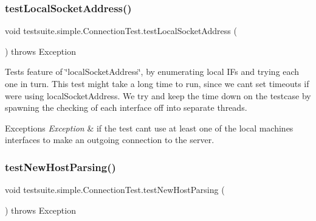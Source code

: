 \subsubsection{\texorpdfstring{test\+Local\+Socket\+Address()}{testLocalSocketAddress()}}
{\footnotesize\ttfamily void testsuite.\+simple.\+Connection\+Test.\+test\+Local\+Socket\+Address (\begin{DoxyParamCaption}{ }\end{DoxyParamCaption}) throws Exception}

Tests feature of \char`\"{}local\+Socket\+Address\char`\"{}, by enumerating local IF\textquotesingle{}s and trying each one in turn. This test might take a long time to run, since we can\textquotesingle{}t set timeouts if we\textquotesingle{}re using local\+Socket\+Address. We try and keep the time down on the testcase by spawning the checking of each interface off into separate threads.


\begin{DoxyExceptions}{Exceptions}
{\em Exception} & if the test can\textquotesingle{}t use at least one of the local machine\textquotesingle{}s interfaces to make an outgoing connection to the server. \\
\hline
\end{DoxyExceptions}
\mbox{\label{classtestsuite_1_1simple_1_1_connection_test_a2def0e0f5805bc123f27ecfaa3e1bbd7}} 
\subsubsection{\texorpdfstring{test\+New\+Host\+Parsing()}{testNewHostParsing()}}
{\footnotesize\ttfamily void testsuite.\+simple.\+Connection\+Test.\+test\+New\+Host\+Parsing (\begin{DoxyParamCaption}{ }\end{DoxyParamCaption}) throws Exception}

\mbox{\label{classtestsuite_1_1simple_1_1_connection_test_a8965be404ac9488d5926ecd89eaeb919}} 

